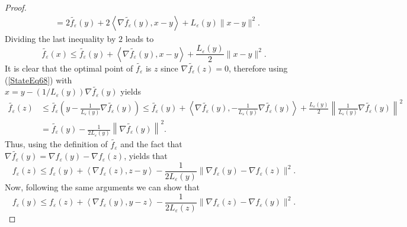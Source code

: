 \documentclass[11pt]{article}
\numberwithin{equation}{section}
\begin{document}
\begin{proof}
\begin{equation*}
\begin{aligned}
	&= 2\widetilde{f_{\varepsilon}}(y) + 2 \left\langle \nabla \widetilde{f_{\varepsilon}}(y), x-y \right\rangle + L_{\varepsilon}(y) \|x-y\|^2.
\end{aligned}
\end{equation*}
Dividing the last inequality by $2$ leads to
\begin{equation}
	\widetilde{f_{\varepsilon}}(x) \leq \widetilde{f_{\varepsilon}}(y) + \left\langle \nabla \widetilde{f_{\varepsilon}}(y), x-y \right\rangle + \frac{L_{\varepsilon}(y)}{2} \|x-y\|^2. \label{StateEq68}
\end{equation}
It is clear that the optimal point of $\widetilde{f_{\varepsilon}}$ is $z$ since $\nabla \widetilde{f_{\varepsilon}}(z) = 0$, therefore using (\ref{StateEq68}) with \\$x = y - \left( 1/L_{\varepsilon}(y) \right) \nabla \widetilde{f_{\varepsilon}}(y)$ yields
\begin{equation*}
\begin{aligned}
	\widetilde{f_{\varepsilon}}(z) &\leq \widetilde{f_{\varepsilon}}\left( y - \frac{1}{L_{\varepsilon}(y)} \nabla \widetilde{f_{\varepsilon}}(y) \right) \leq \widetilde{f_{\varepsilon}}(y) + \left\langle \nabla \widetilde{f_{\varepsilon}}(y), - \frac{1}{L_{\varepsilon}(y)} \nabla \widetilde{f_{\varepsilon}}(y) \right\rangle + \frac{L_{\varepsilon}(y)}{2} \left\lVert \frac{1}{L_{\varepsilon}(y)} \nabla \widetilde{f_{\varepsilon}}(y) \right\rVert ^2 \\
	&= \widetilde{f_{\varepsilon}}(y) - \frac{1}{2 L_{\varepsilon}(y)} \left\lVert \nabla \widetilde{f_{\varepsilon}}(y) \right\rVert ^2.
\end{aligned}
\end{equation*}
Thus, using the definition of $\widetilde{f_{\varepsilon}}$ and the fact that $\nabla \widetilde{f_{\varepsilon}}(y) = \nabla f_{\varepsilon}(y) - \nabla f_{\varepsilon}(z)$, yields that
\begin{equation*}
	f_{\varepsilon}(z) \leq f_{\varepsilon}(y) + \left\langle \nabla f_{\varepsilon}(z), z - y \right\rangle - \frac{1}{2 L_{\varepsilon}(y)} \| \nabla f_{\varepsilon}(y) - \nabla f_{\varepsilon}(z) \|^2 .
\end{equation*}
Now, following the same arguments we can show that
\begin{equation*}
	f_{\varepsilon}(y) \leq f_{\varepsilon}(z) + \left\langle \nabla f_{\varepsilon}(y), y - z \right\rangle - \frac{1}{2 L_{\varepsilon}(z)} \| \nabla f_{\varepsilon}(z) - \nabla f_{\varepsilon}(y) \|^2 .
\end{equation*}

\end{proof}
\end{document}
